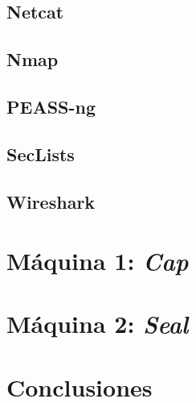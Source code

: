 \documentclass[a4paper, 12pt]{article} %
\begin{document}
\begin{otherlanguage}{spanish}
    \subsection{Netcat}
    

    \subsection{Nmap}
    

    \subsection{PEASS-ng}
    

    \subsection{SecLists}
    

    \subsection{Wireshark}
    

    \newpage
    \section{Máquina 1: \textit{Cap}}
    

    \newpage
    \section{Máquina 2: \textit{Seal}}
    

    \newpage
    \section{Conclusiones}
    

    \newpage
    \printbibliography[heading=bibnumbered] %

\end{otherlanguage}
\end{document}
